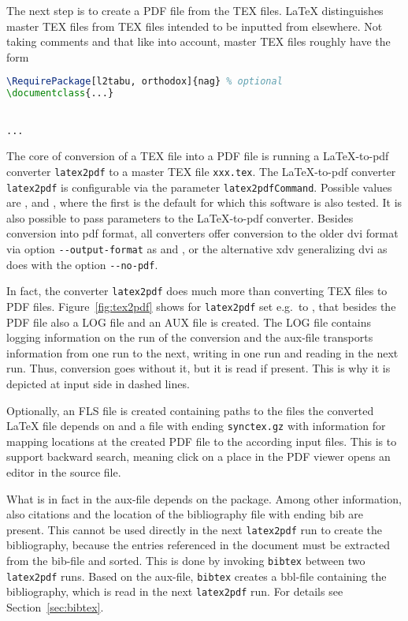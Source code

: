The next step is to create a PDF file from the TEX files. 
\LaTeX{} distinguishes master TEX files from TEX files intended to be inputted
from elsewhere. 
Not taking comments and that like into account, 
master TEX files roughly have the form 
%
\begin{lstlisting}[language=tex, basicstyle=\small]
\RequirePackage[l2tabu, orthodox]{nag} % optional 
\documentclass{...}


...

\end{lstlisting}

The core of conversion of a TEX file into a PDF file 
is running a \LaTeX{}-to-pdf converter \texttt{latex2pdf} 
to a master TEX file \texttt{xxx.tex}.
The \LaTeX-to-pdf converter \texttt{latex2pdf} 
is configurable via the parameter \texttt{latex2pdfCommand}. 
Possible values are \lualatex{}, \xelatex{} and \pdflatex, 
where the first is the default for which this software is also tested. 
It is also possible to pass parameters to the \LaTeX{}-to-pdf converter. 
Besides conversion into \gls{pdf} format, 
all converters offer conversion to the older \gls{dvi} format 
via option \texttt{-{}-output-format} as \lualatex{} and \pdflatex, 
or the alternative \gls{xdv} generalizing \gls{dvi} 
as \xelatex{} does with the option \texttt{-{}-no-pdf}. 

In fact, the converter \texttt{latex2pdf} 
does much more than converting TEX files to PDF files. 
Figure~\ref{fig:tex2pdf} shows for \texttt{latex2pdf} set e.g.~to \lualatex{}, 
that besides the PDF file also a LOG file and an AUX file is created. 
The LOG file contains logging information on the run of the conversion 
and the aux-file transports information from one run to the next, 
writing in one run and reading in the next run. 
Thus, conversion goes without it, but it is read if present. 
This is why it is depicted at input side in dashed lines. 

Optionally, an FLS file is created containing paths to the files 
the converted \LaTeX{} file depends on 
and a file with ending \texttt{synctex.gz} 
with information for mapping locations at the created PDF file 
to the according input files. 
This is to support backward search, meaning click on a place in the PDF viewer 
opens an editor in the source file. 

What is in fact in the aux-file depends on the package. 
Among other information, 
also citations and the location of the bibliography file with ending bib 
are present. 
This cannot be used directly in the next \texttt{latex2pdf} run 
to create the bibliography, 
because the entries referenced in the document must be extracted from the bib-file 
and sorted. 
This is done by invoking \texttt{bibtex} between two \texttt{latex2pdf} runs. 
Based on the aux-file, \texttt{bibtex} creates a bbl-file 
containing the bibliography, which is read in the next \texttt{latex2pdf} run. 
For details see Section~\ref{sec:bibtex}. 

